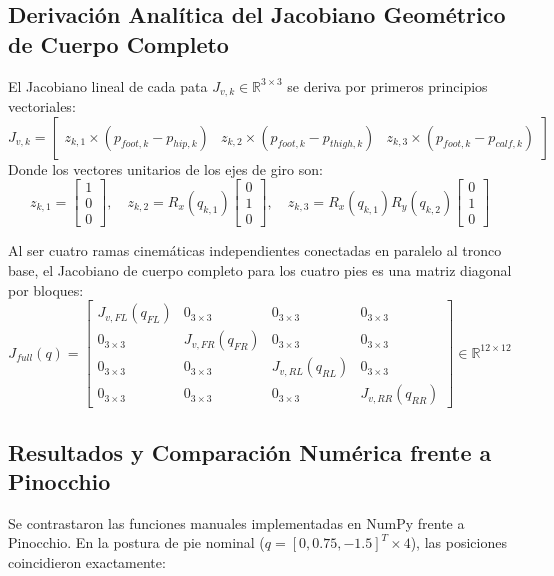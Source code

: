 \documentclass[11pt,a4paper]{article}
\begin{document}
\subsection{Derivación Analítica del Jacobiano Geométrico de Cuerpo Completo}
El Jacobiano lineal de cada pata $J_{v, k} \in \mathbb{R}^{3 \times 3}$ se deriva por primeros principios vectoriales:
\begin{equation}
J_{v, k} = \begin{bmatrix} z_{k, 1} \times (p_{foot, k} - p_{hip, k}) & z_{k, 2} \times (p_{foot, k} - p_{thigh, k}) & z_{k, 3} \times (p_{foot, k} - p_{calf, k}) \end{bmatrix}
\end{equation}
Donde los vectores unitarios de los ejes de giro son:
\begin{equation}
z_{k, 1} = \begin{bmatrix} 1 \\ 0 \\ 0 \end{bmatrix}, \quad z_{k, 2} = R_x(q_{k,1}) \begin{bmatrix} 0 \\ 1 \\ 0 \end{bmatrix}, \quad z_{k, 3} = R_x(q_{k,1}) R_y(q_{k,2}) \begin{bmatrix} 0 \\ 1 \\ 0 \end{bmatrix}
\end{equation}

Al ser cuatro ramas cinemáticas independientes conectadas en paralelo al tronco base, el Jacobiano de cuerpo completo para los cuatro pies es una matriz diagonal por bloques:
\begin{equation}
J_{full}(q) = \begin{bmatrix}
J_{v, FL}(q_{FL}) & 0_{3\times 3} & 0_{3\times 3} & 0_{3\times 3} \\
0_{3\times 3} & J_{v, FR}(q_{FR}) & 0_{3\times 3} & 0_{3\times 3} \\
0_{3\times 3} & 0_{3\times 3} & J_{v, RL}(q_{RL}) & 0_{3\times 3} \\
0_{3\times 3} & 0_{3\times 3} & 0_{3\times 3} & J_{v, RR}(q_{RR})
\end{bmatrix} \in \mathbb{R}^{12 \times 12}
\end{equation}

\subsection{Resultados y Comparación Numérica frente a Pinocchio}
Se contrastaron las funciones manuales implementadas en NumPy frente a Pinocchio. En la postura de pie nominal ($q = [0, 0.75, -1.5]^T \times 4$), las posiciones coincidieron exactamente:
\end{document}
